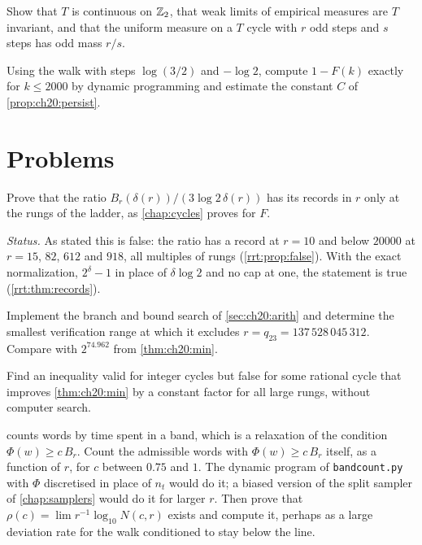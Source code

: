 \begin{exercise}
Show that $T$ is continuous on $\mathbb{Z}_2$, that weak limits of empirical measures are $T$ invariant, and that the uniform measure on a $T$ cycle with $r$ odd steps and $s$ steps has odd mass $r/s$.
\end{exercise}

\begin{exercise}
Using the walk with steps $\log(3/2)$ and $-\log2$, compute $1-F(k)$ exactly for $k\le2000$ by dynamic programming and estimate the constant $C$ of \cref{prop:ch20:persist}.
\end{exercise}

\section*{Problems}

\begin{problem*}\label{prob:ch20:records}
Prove that the ratio $B_r(\delta(r))/(3\log2\,\delta(r))$ has its records in $r$ only at the rungs of the ladder, as \cref{chap:cycles} proves for $F$.
\end{problem*}

\emph{Status.} As stated this is false: the ratio has a record at $r=10$ and below $20000$ at $r=15$, $82$, $612$ and $918$, all multiples of rungs (\cref{rrt:prop:false}). With the exact normalization, $2^{\delta}-1$ in place of $\delta\log2$ and no cap at one, the statement is true (\cref{rrt:thm:records}).

\begin{problem*}\label{prob:ch20:branch}
Implement the branch and bound search of \cref{sec:ch20:arith} and determine the smallest verification range at which it excludes $r=q_{23}=137\,528\,045\,312$. Compare with $2^{74.962}$ from \cref{thm:ch20:min}.
\end{problem*}

\begin{problem*}\label{prob:ch20:integer}
Find an inequality valid for integer cycles but false for some rational cycle that improves \cref{thm:ch20:min} by a constant factor for all large rungs, without computer search.
\end{problem*}

\begin{problem*}\label{prob:ch20:band}
 counts words by time spent in a band, which is a relaxation of the condition $\Phi(w)\ge c\,B_r$. Count the admissible words with $\Phi(w)\ge c\,B_r$ itself, as a function of $r$, for $c$ between $0.75$ and $1$. The dynamic program of \texttt{bandcount.py} with $\Phi$ discretised in place of $n_t$ would do it; a biased version of the split sampler of \cref{chap:samplers} would do it for larger $r$. Then prove that $\rho(c)=\lim r^{-1}\log_{10}N(c,r)$ exists and compute it, perhaps as a large deviation rate for the walk conditioned to stay below the line.
\end{problem*}

